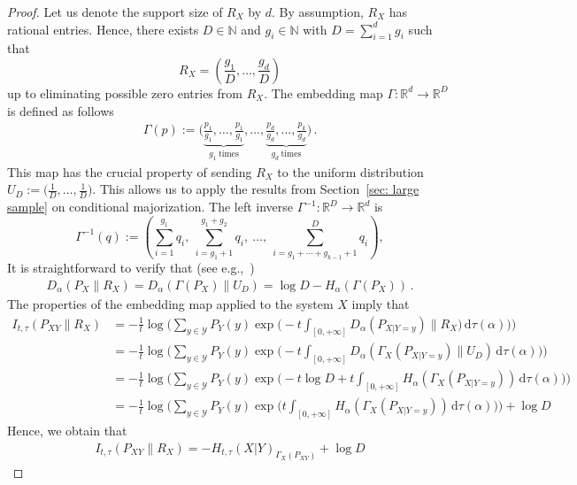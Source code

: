 \documentclass[aps,pra,11pt,onecolumn,nofootinbib,tightenlines]{revtex4-2}
\theoremstyle{definition}
\newcommand{\mc}[1]{\mathcal{#1}}
\begin{document}
\begin{proof}
Let us denote the support size of $R_X$ by $d$. By assumption, $R_X$ has rational entries. Hence, there exists $D \in \mathbb{N}$ and $g_i \in \mathbb{N}$ with $D= \sum_{i=1}^d g_i$ such that
\begin{equation}
R_X = \left( \frac{g_1}{D}, \ldots, \frac{g_d}{D} \right)
\end{equation}
up to eliminating possible zero entries from $R_X$. The embedding map $\Gamma : \mathbb{R}^d \to \mathbb{R}^D$ is defined as follows
\begin{align}
\Gamma(p) := \Big( \underbrace{\frac{p_1}{g_1}, \ldots, \frac{p_1}{g_1}}_{g_1 \ \text{times}}, \ldots, \underbrace{\frac{p_d}{g_d}, \ldots, \frac{p_k}{g_d}}_{g_d \ \text{times}} \Big)\,.
\end{align}
This map has the crucial property of sending $R_X$ to the uniform distribution $U_D := \big(\tfrac{1}{D}, \ldots, \tfrac{1}{D}\big)$. This allows us to apply the results from Section~\ref{sec: large sample} on conditional majorization. 
The left inverse $\Gamma^{-1} : \mathbb{R}^D \to \mathbb{R}^d$ is 
\begin{equation}
\label{PsInvEmbed}
\Gamma^{-1}(q) := \left( \sum_{i=1}^{g_1} q_i,\ \sum_{i=g_1+1}^{g_1 + g_2} q_i,\ \ldots,\ \sum_{i = g_1 + \cdots + g_{k-1} + 1}^{D} q_i \right),
\end{equation}
It is straightforward to verify that (see e.g.,~\cite[Lemma 13]{Brandao})
\begin{align}
    D_{\alpha}(P_X \| R_X) = D_{\alpha}(\Gamma(P_X) \| U_D) = \log{D} - H_\alpha (\Gamma(P_X))\,.
\end{align}
The properties of the embedding map applied to the system $X$ imply that
\begin{align}
    I_{t,\tau}(P_{XY} \| R_X) &=  -\frac{1}{t} \log \Bigg( \sum_{y \in \mc Y} P_Y(y) \exp \Big( -t\int_{[0,+\infty]}D_\alpha(P_{X|Y=y}) \| R_{X}) \, \mathrm{d} \tau(\alpha) \Big) \Bigg) \\
    & =-\frac{1}{t} \log \Bigg( \sum_{y \in\mc Y} P_Y(y) \exp \Big( -t\int_{[0,+\infty]} D_\alpha(\Gamma_X(P_{X|Y=y}) \| U_D) \, \mathrm{d} \tau(\alpha) \Big) \Bigg) \\
    & = -\frac{1}{t} \log \Bigg( \sum_{y \in\mc Y} P_Y(y) \exp \Big( -t \log{D} +t\int_{[0,+\infty]} H_\alpha(\Gamma_X(P_{X|Y=y})) \, \mathrm{d} \tau(\alpha) \Big) \Bigg)\\
    & = -\frac{1}{t} \log \Bigg( \sum_{y \in\mc Y} P_Y(y) \exp \Big(t\int_{[0,+\infty]} H_\alpha(\Gamma_X(P_{X|Y=y})) \, \mathrm{d} \tau(\alpha) \Big) \Bigg) + \log{D}
\end{align}
Hence, we obtain that
\begin{align}
    I_{t,\tau}(P_{XY} \| R_X) = -H_{t,\tau}(X|Y)_{\Gamma_X(P_{XY})} + \log{D}
\end{align}


\end{proof}
\end{document}

